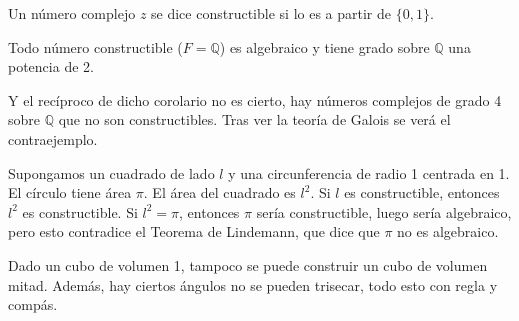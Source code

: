 \begin{definicion}
    Un número complejo $z$ se dice constructible si lo es a partir de $\{0,1\}$.
\end{definicion}

\begin{coro}
    Todo número constructible ($F=\mathbb{Q}$) es algebraico y tiene grado sobre $\mathbb{Q}$ una potencia de 2.
\end{coro}

Y el recíproco de dicho corolario no es cierto, hay números complejos de grado 4 sobre $\mathbb{Q}$ que no son constructibles. Tras ver la teoría de Galois se verá el contraejemplo.

\begin{ejemplo}
    Supongamos un cuadrado de lado $l$ y una circunferencia de radio 1 centrada en 1. El círculo tiene área $\pi$. El área del cuadrado es $l^2$. Si $l$ es constructible, entonces $l^2$ es constructible. Si $l^2=\pi$, entonces $\pi$ sería constructible, luego sería algebraico, pero esto contradice el Teorema de Lindemann, que dice que $\pi$ no es algebraico.
\end{ejemplo}

\noindent
Dado un cubo de volumen 1, tampoco se puede construir un cubo de volumen mitad. Además, hay ciertos ángulos no se pueden trisecar, todo esto con regla y compás.

